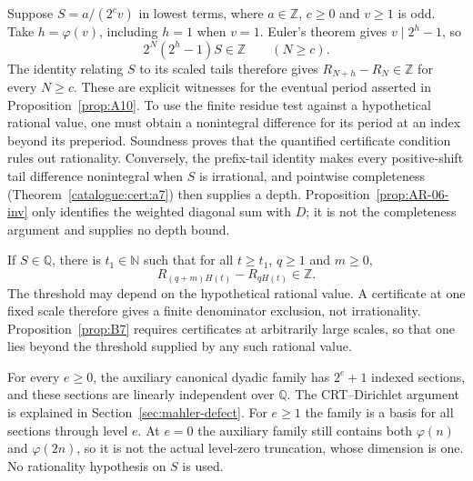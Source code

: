 \begin{prop}\label{prop:A9-inv}
Suppose $S=a/(2^c v)$ in lowest terms, where $a\in\mathbb Z$,
$c\ge0$ and $v\ge1$ is odd. Take $h=\varphi(v)$, including
$h=1$ when $v=1$. Euler's theorem gives $v\mid2^h-1$, so
\[
 2^N(2^h-1)S\in\mathbb Z\qquad(N\ge c).
\]
The identity relating $S$ to its scaled tails therefore gives
$R_{N+h}-R_N\in\mathbb Z$ for every $N\ge c$.
These are explicit witnesses for the eventual period asserted in
Proposition~\ref{prop:A10}. To use the finite residue test against a
hypothetical rational value, one must obtain a nonintegral difference
for its period at an index beyond its preperiod. Soundness proves that
the quantified certificate condition rules out rationality. Conversely,
the prefix-tail identity makes every positive-shift tail difference
nonintegral when $S$ is irrational, and pointwise completeness
(Theorem~\ref{catalogue:cert:a7}) then supplies a depth.
Proposition~\ref{prop:AR-06-inv} only identifies the weighted diagonal
sum with $D$; it is not the completeness argument and supplies no
depth bound.
\end{prop}

\begin{prop}\label{prop:B6-inv}
If $S\in\mathbb Q$, there is $t_1\in\mathbb N$ such that for all
$t\ge t_1$, $q\ge1$ and $m\ge0$,
\[
 R_{(q+m)H(t)}-R_{qH(t)}\in\mathbb Z.
\]
The threshold may depend on the hypothetical rational value. A
certificate at one fixed scale therefore gives a finite denominator
exclusion, not irrationality. Proposition~\ref{prop:B7} requires
certificates at arbitrarily large scales, so that one lies beyond the
threshold supplied by any such rational value.

\end{prop}

\begin{prop}\label{prop:D4-inv}
For every $e\ge0$, the auxiliary canonical dyadic family has
$2^e+1$ indexed sections, and these sections are linearly independent
over $\mathbb Q$. The CRT--Dirichlet argument is explained in
Section~\ref{sec:mahler-defect}. For $e\ge1$ the family is a basis for all sections through level
$e$. At $e=0$ the auxiliary family still contains both $\varphi(n)$ and
$\varphi(2n)$, so it is not the actual level-zero truncation, whose
dimension is one. No rationality hypothesis on $S$ is used.

\end{prop}

